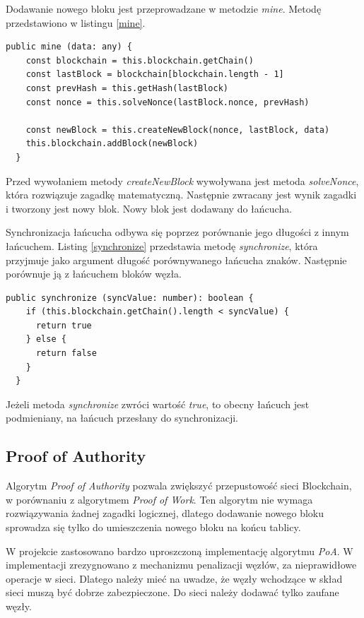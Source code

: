 \documentclass[a4paper,12pt]{book}
\begin{document}
Dodawanie nowego bloku jest przeprowadzane w metodzie \textit{mine}. Metodę przedstawiono w listingu \ref{mine}.

\begin{lstlisting}[style=ES6, caption={Dodawanie nowego bloku. Metoda \textit{mine}.},label={mine}]
  public mine (data: any) {
    const blockchain = this.blockchain.getChain()
    const lastBlock = blockchain[blockchain.length - 1]
    const prevHash = this.getHash(lastBlock)
    const nonce = this.solveNonce(lastBlock.nonce, prevHash)

    const newBlock = this.createNewBlock(nonce, lastBlock, data)
    this.blockchain.addBlock(newBlock)
  }
\end{lstlisting}

Przed wywołaniem metody \textit{createNewBlock} wywoływana jest metoda \textit{solveNonce}, która rozwiązuje zagadkę matematyczną. Następnie zwracany jest wynik zagadki i tworzony jest nowy blok. Nowy blok jest dodawany do łańcucha.

Synchronizacja łańcucha odbywa się poprzez porównanie jego długości z innym łańcuchem. Listing \ref{synchronize} przedstawia metodę \textit{synchronize}, która przyjmuje jako argument długość porównywanego łańcucha znaków. Następnie porównuje ją z łańcuchem bloków węzła.

\begin{lstlisting}[style=ES6, caption={Metoda \textit{synchronize}.},label={synchronize}]
  public synchronize (syncValue: number): boolean {
    if (this.blockchain.getChain().length < syncValue) {
      return true
    } else {
      return false
    }
  }
\end{lstlisting}

Jeżeli metoda \textit{synchronize} zwróci wartość \textit{true}, to obecny łańcuch jest podmieniany, na łańcuch przesłany do synchronizacji.
 
\subsection{Proof of Authority}
Algorytm \textit{Proof of Authority} pozwala zwiększyć przepustowość sieci Blockchain, w porównaniu z algorytmem \textit{Proof of Work}. Ten algorytm nie wymaga rozwiązywania żadnej zagadki logicznej, dlatego dodawanie nowego bloku sprowadza się tylko do umieszczenia nowego bloku na końcu tablicy. 
 
W projekcie zastosowano bardzo uproszczoną implementację algorytmu \textit{PoA}. W implementacji zrezygnowano z mechanizmu penalizacji węzłów, za nieprawidłowe operacje w sieci. Dlatego należy mieć na uwadze, że węzły wchodzące w skład sieci muszą być dobrze zabezpieczone. Do sieci należy dodawać tylko zaufane węzły.
 
\end{document}
